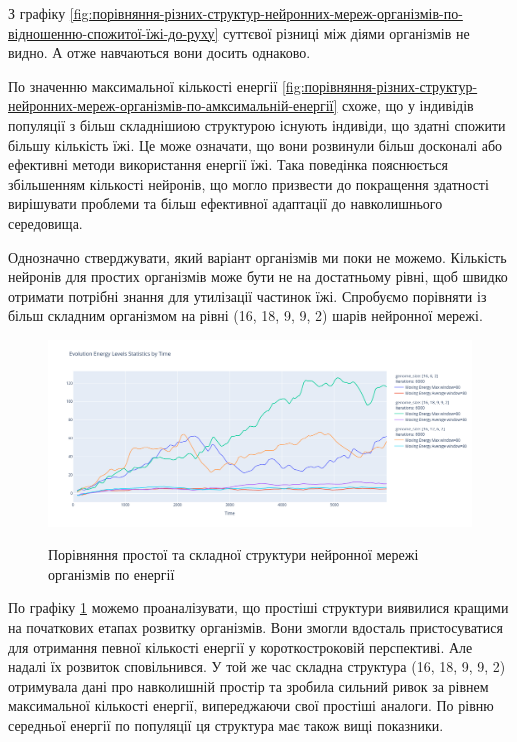 З графіку
\ref{fig:порівняння-різних-структур-нейронних-мереж-організмів-по-відношенню-спожитої-їжі-до-руху} 
суттєвої різниці між діями організмів не видно.
А отже навчаються вони досить однаково.

По значенню максимальної кількості енергії
\ref{fig:порівняння-різних-структур-нейронних-мереж-організмів-по-амксимальній-енергії}
схоже, що у індивідів популяції
з більш складнішиою структурою існують індивіди,
що здатні спожити більшу кількість їжі.
Це може означати, що вони розвинули більш досконалі або
ефективні методи використання енергії їжі.
Така поведінка пояснюється збільшенням кількості нейронів,
що могло призвести до покращення здатності вирішувати проблеми
та більш ефективної адаптації до навколишнього середовища.

Однозначно стверджувати, який варіант організмів ми поки не можемо.
Кількість нейронів для простих організмів може бути не на достатньому рівні,
щоб швидко отримати потрібні знання для утилізації частинок їжі.
Спробуємо порівняти із більш складним організмом на рівні
(16, 18, 9, 9, 2) шарів нейронної мережі.


\begin{figure}[ht]
  \centering
  \caption{Порівняння простої та складної структури нейронної мережі організмів по енергії}
  \includegraphics[scale=0.3]{Images/comparing-genomes-energy-levels-complex-is-leader.png}
  \label{fig:порівняння-простої-та-складної-структури-нейронної-мережі-організмів-по-енергії}
\end{figure}

По графіку \ref{fig:порівняння-простої-та-складної-структури-нейронної-мережі-організмів-по-енергії}
можемо проаналізувати, що простіші структури виявилися кращими на початкових
етапах розвитку організмів.
Вони змогли вдосталь пристосуватися для отримання певної кількості енергії
у короткостроковій перспективі.
Але надалі їх розвиток сповільнився.
У той же час складна структура (16, 18, 9, 9, 2) отримувала дані
про навколишній простір та зробила сильний ривок
за рівнем максимальної кількості енергії,
випереджаючи свої простіші аналоги.
По рівню середньої енергії по популяції ця структура має також вищі показники.


